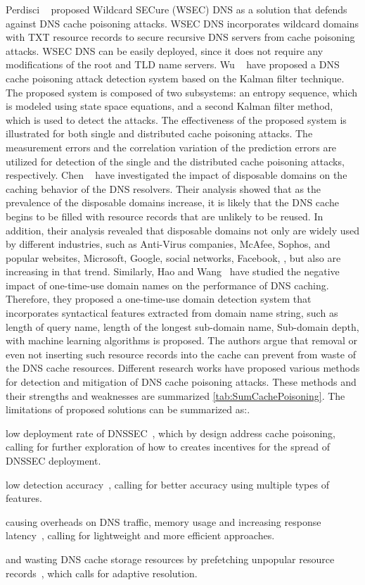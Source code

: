 Perdisci \etal~ proposed Wildcard SECure (WSEC) DNS as a solution that defends against DNS cache poisoning attacks. WSEC DNS incorporates wildcard domains with TXT resource records to secure recursive DNS servers from cache poisoning attacks. WSEC DNS can be easily deployed, since it does not require any modifications of the root and TLD name servers. 
Wu \etal~ have proposed a DNS cache poisoning attack detection system based on the Kalman filter technique. The proposed system is composed of two subsystems: an entropy sequence, which is modeled using state space equations, and a second Kalman filter method, which is used to detect the attacks. The effectiveness of the proposed system is illustrated for both single and distributed cache poisoning attacks. The measurement errors and the correlation variation of the prediction errors are utilized for detection of the single and the distributed cache poisoning attacks, respectively. 
Chen \etal~ have investigated the impact of disposable domains on the caching behavior of the DNS resolvers. Their analysis showed that as the prevalence of the disposable domains increase, it is likely that the DNS cache begins to be filled with resource records that are unlikely to be reused. In addition, their analysis revealed that disposable domains not only are widely used by different industries, such as Anti-Virus companies, \eg McAfee, Sophos, and popular websites, \eg Microsoft, Google, social networks, \eg Facebook, \etc, but also are increasing in that trend. 
Similarly, Hao and Wang~ have studied the negative impact of one-time-use domain names on the performance of DNS caching. Therefore, they proposed a one-time-use domain detection system that incorporates syntactical features extracted from domain name string, such as length of query name, length of the longest sub-domain name, Sub-domain depth, \etc with machine learning algorithms is proposed. The authors argue that removal or even not inserting such resource records into the cache can prevent from waste of the DNS cache resources. 
 Different research works have proposed various methods for detection and mitigation of DNS cache poisoning attacks. These methods and their strengths and weaknesses are summarized \autoref{tab:SumCachePoisoning}. The limitations of proposed solutions can be summarized as:. 
\begin{enumerate*}
    \item low deployment rate of DNSSEC~, which by design address cache poisoning, calling for further exploration of how to creates incentives for the spread of DNSSEC deployment. 
    \item low detection accuracy~, calling for better accuracy using multiple types of features. \item causing overheads on DNS traffic, memory usage and increasing response latency~, calling for lightweight and more efficient approaches. 
    \item and wasting DNS cache storage resources by prefetching unpopular resource records~, which calls for adaptive resolution. 
\end{enumerate*}

